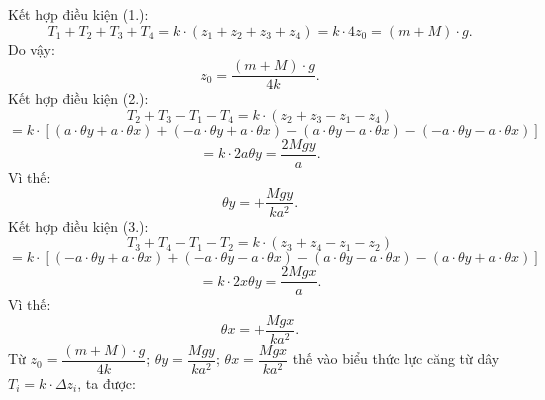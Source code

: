 \begin{enumerate}[label=(\alph*)]
\begin{enumerate}[label=(\roman*)]
    Kết hợp điều kiện (1.):
    \begin{equation}
        T_1 + T_2 +T_3 +T_4 = k \cdot (z_1 +z_2+z_3+z_4) = k \cdot 4z_0 = (m+M)\cdot g.
    \end{equation}
    Do vậy:
    \begin{equation}
        z_0 = \dfrac{(m+M)\cdot g}{4k}.
    \end{equation}
    Kết hợp điều kiện (2.):
    \begin{equation}
        T_2 +T_3 - T_1 -T_4 = k \cdot (z_2 +z_3 - z_1 - z_4)
    \end{equation}
    \begin{equation} 
        = k \cdot \left[(a \cdot \theta y + a \cdot \theta x) + (-a \cdot \theta y + a \cdot \theta x) - (a \cdot \theta y - a \cdot \theta x) - (-a \cdot \theta y - a \cdot \theta x)\right]
    \end{equation}
    \begin{equation}
        = k \cdot 2a \theta y = \dfrac{2Mgy}{a}.
    \end{equation}
    Vì thế:
    \begin{equation}
        \theta y = + \dfrac{Mgy}{ka^2}.
    \end{equation}
    Kết hợp điều kiện (3.):
    \begin{equation}
        T_3 +T_4 - T_1 -T_2 = k \cdot (z_3 +z_4 - z_1 - z_2)
    \end{equation}
    \begin{equation} 
        = k \cdot \left[(-a \cdot \theta y + a \cdot \theta x) + (-a \cdot \theta y - a \cdot \theta x) - (a \cdot \theta y - a \cdot \theta x) - (a \cdot \theta y + a \cdot \theta x)\right]
    \end{equation}
    \begin{equation}
        = k \cdot 2x \theta y = \dfrac{2Mgx}{a}.
    \end{equation}
    Vì thế:
    \begin{equation}
        \theta x = + \dfrac{Mgx}{ka^2}.
    \end{equation}
    Từ $z_0 = \dfrac{(m +M)\cdot g}{4k}$; $\theta y = \dfrac {Mgy}{ka^2}$; $\theta x = \dfrac {Mgx}{ka^2}$ thế vào biểu thức lực căng từ dây $T_i=k \cdot \Delta z_i$, ta được:
    

\end{enumerate}
\end{enumerate}
